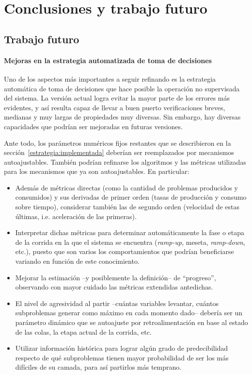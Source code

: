 \chapter{Conclusiones y trabajo futuro}
\label{conclu}

\section{Trabajo futuro}


\subsubsection{Mejoras en la estrategia automatizada de toma de decisiones}

Uno de los aspectos más importantes a seguir refinando es la estrategia automática de toma de decisiones que hace posible la operación no supervisada del sistema. La versión actual logra evitar la mayor parte de los errores más evidentes, y así resulta capaz de llevar a buen puerto verificaciones breves, medianas y muy largas de propiedades muy diversas. Sin embargo, hay diversas capacidades que podrían ser mejoradas en futuras versiones.

Ante todo, los parámetros numéricos fijos restantes que se describieron en la sección~\ref{estrategia:implementada} deberían ser reemplazados por mecanismos autoajustables. También podrían refinarse los algoritmos y las métricas utilizadas para los mecanismos que ya son autoajustables. En particular:

\begin{itemize}
	\item Además de métricas directas (como la cantidad de problemas producidos y consumidos) y sus derivadas de primer orden (tasas de producción y consumo sobre tiempo), considerar también las de segundo orden (velocidad de estas últimas, i.e. aceleración de las primeras).
	\item Interpretar dichas métricas para determinar automáticamente la fase o etapa de la corrida en la que el sistema se encuentra (\emph{ramp-up}, meseta, \emph{ramp-down}, etc.), puesto que son varios los comportamientos que podrían beneficiarse variando en función de este conocimiento.
	\item Mejorar la estimación --y posiblemente la definición-- de ``progreso'', observando con mayor cuidado las métricas extendidas antedichas.
	\item El nivel de agresividad al partir --cuántas variables levantar, cuántos subproblemas generar como máximo en cada momento dado-- debería ser un parámetro dinámico que se autoajuste por retroalimentación en base al estado de las colas, la etapa actual de la corrida, etc.
	\item Utilizar información histórica para lograr algún grado de predecibilidad respecto de qué subproblemas tienen mayor probabilidad de ser los más difíciles de su camada, para así partirlos más temprano.
	\end{itemize}


